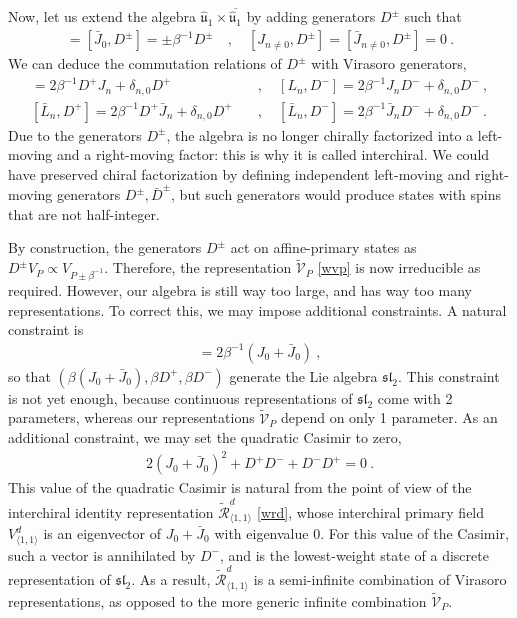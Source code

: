 \documentclass[12pt, a4paper]{article}
\begin{document}
Now, let us extend the algebra $\hat{\mathfrak{u}}_1\times \overline{\hat{\mathfrak{u}}_1}$ by adding generators $D^\pm$ such that 
\begin{align}
 [J_0,D^\pm] = [\bar J_0,D^\pm] = \pm \beta^{-1}D^\pm \quad , \quad [J_{n\neq 0},D^\pm]=[\bar J_{n\neq 0},D^\pm]=0 \ .
\end{align}
We can deduce the commutation relations of $D^\pm$ with Virasoro generators,
\begin{align}
 [L_n,D^+] =2\beta^{-1}D^+J_n +\delta_{n,0}D^+ &\quad , \quad [L_n,D^-] =2\beta^{-1}J_nD^- +\delta_{n,0}D^- \ ,
 \\
 [\bar L_n,D^+] =2\beta^{-1}D^+\bar J_n +\delta_{n,0}D^+ &\quad , \quad [\bar L_n,D^-] =2\beta^{-1}\bar J_nD^- +\delta_{n,0}D^- \ .
\end{align}
Due to the generators $D^\pm$, the algebra is no longer chirally factorized into a left-moving and a right-moving factor: this is why it is called interchiral. We could have preserved chiral factorization by defining independent left-moving and right-moving generators $D^\pm,\bar D^\pm$, but such generators would produce states with spins that are not half-integer. 

By construction, the generators $D^\pm$ act on affine-primary states as $D^\pm V_P \propto V_{P\pm \beta^{-1}}$. Therefore, the representation $\widetilde{\mathcal{V}}_P$ \eqref{wvp} is now irreducible as required. However, our algebra is still way too large, and has way too many representations. To correct this, we may impose additional constraints. A natural constraint is
\begin{align}
 [D^+, D^-] = 2\beta^{-1}(J_0+\bar J_0) \ , 
\end{align}
so that $\left(\beta(J_0+\bar J_0),\beta D^+,\beta D^-\right)$ generate the Lie algebra $\mathfrak{sl}_2$. This constraint is not yet enough, because continuous representations of $\mathfrak{sl}_2$ come with 2 parameters, whereas our representations $\widetilde{\mathcal{V}}_P$ depend on only 1 parameter. As an additional constraint, we may set the quadratic Casimir to zero,
\begin{align}
 2(J_0+\bar J_0)^2 + D^+D^- + D^-D^+ = 0 \ .
\end{align}
This value of the quadratic Casimir is natural from the point of view of the interchiral identity representation $\widetilde{\mathcal{R}}^d_{\langle 1,1\rangle}$ \eqref{wrd}, whose interchiral primary field $V^d_{\langle 1,1\rangle}$ is an eigenvector of $J_0+\bar J_0$ with eigenvalue $0$. For this value of the Casimir, such a vector is annihilated by $D^-$, and is the lowest-weight state of a discrete representation of $\mathfrak{sl}_2$. As a result, $\widetilde{\mathcal{R}}^d_{\langle 1,1\rangle}$ is a semi-infinite combination of Virasoro representations, as opposed to the more generic infinite combination $\widetilde{\mathcal{V}}_P$. 
\end{document}
